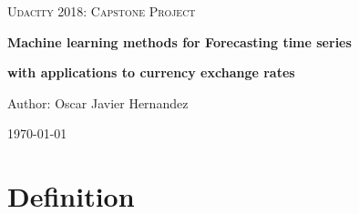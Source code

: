 \documentclass[10pt,a4paper]{article}
\begin{document}

\begin{titlepage}
	\centering
	\vspace{1cm}
	{\scshape\Large Udacity 2018: Capstone Project \par}
	\vspace{1.5cm}
	{\huge\bfseries Machine learning methods for Forecasting time series \par}
	\vspace{1.5cm}
	{\large\bfseries with applications to currency exchange rates \par}
	\vspace{2cm}
	{\Large Author: Oscar Javier Hernandez\par}
	\vfill

	{\large \today\par}
\end{titlepage}

\section{Definition}
\end{document}
